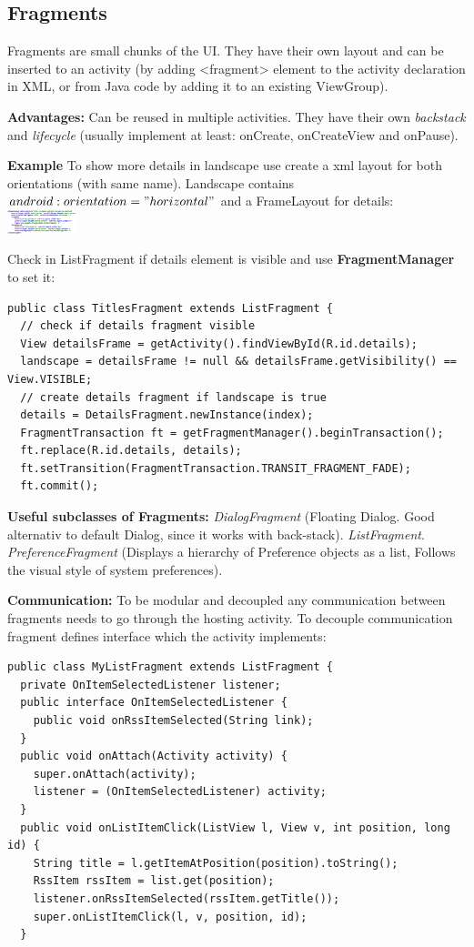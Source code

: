 \subsection{Fragments}
Fragments are small chunks of the UI. They have their own layout and can be
inserted to an activity (by adding <fragment> element to the activity
declaration in XML, or from Java code by adding it to an existing ViewGroup).

\textbf{Advantages:} Can be reused in multiple activities. They have their own
\textit{backstack} and \textit{lifecycle} (usually implement at least:
onCreate, onCreateView and onPause).

\textbf{Example}
To show more details in landscape use create a xml layout for both orientations
(with same name). Landscape contains $android:orientation="horizontal"$ and a
FrameLayout for details:
\includegraphics[width=0.15\textwidth]{android/fragment_details.png}

Check in ListFragment if details element is visible and use
\textbf{FragmentManager} to set it:
\begin{lstlisting}
public class TitlesFragment extends ListFragment {
  // check if details fragment visible
  View detailsFrame = getActivity().findViewById(R.id.details);
  landscape = detailsFrame != null && detailsFrame.getVisibility() == View.VISIBLE;
  // create details fragment if landscape is true
  details = DetailsFragment.newInstance(index);
  FragmentTransaction ft = getFragmentManager().beginTransaction();
  ft.replace(R.id.details, details);
  ft.setTransition(FragmentTransaction.TRANSIT_FRAGMENT_FADE);
  ft.commit();
\end{lstlisting}

\textbf{Useful subclasses of Fragments:}
\textit{DialogFragment} (Floating Dialog. Good alternativ to default Dialog,
since it works with back-stack).  \textit{ListFragment}.
\textit{PreferenceFragment} (Displays a hierarchy of Preference objects as a
list, Follows the visual style of system preferences).

\textbf{Communication:}
To be modular and decoupled any communication between fragments needs to go
through the hosting activity. To decouple communication fragment defines
interface which the activity implements:

\begin{lstlisting}
public class MyListFragment extends ListFragment {
  private OnItemSelectedListener listener;
  public interface OnItemSelectedListener {
    public void onRssItemSelected(String link);
  }
  public void onAttach(Activity activity) {
    super.onAttach(activity);
    listener = (OnItemSelectedListener) activity;
  }
  public void onListItemClick(ListView l, View v, int position, long id) {
    String title = l.getItemAtPosition(position).toString();
    RssItem rssItem = list.get(position);
    listener.onRssItemSelected(rssItem.getTitle());
    super.onListItemClick(l, v, position, id);
  }
\end{lstlisting}

